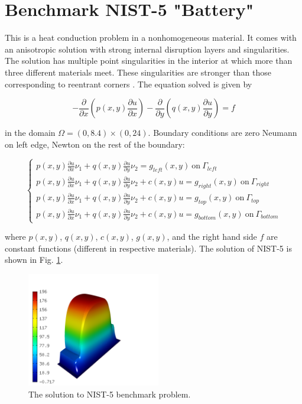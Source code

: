 \section{Benchmark NIST-5 "Battery"}
\label{sec:bench-5}

This is a heat conduction problem in a nonhomogeneous material.
It comes with an anisotropic solution with strong internal disruption
layers and singularities.
The solution has multiple point singularities in the interior at which
more than three different materials meet. These singularities are stronger than those
corresponding to reentrant corners \cite{demkowicz-1}.
The equation solved is given by

\begin{equation} \label{heat-conduction}
-\frac{\partial }{\partial x}\left(p(x, y)\frac{\partial u}{\partial x}\right)
-\frac{\partial }{\partial y}\left(q(x, y)\frac{\partial u}{\partial y}\right) = f 
\end{equation}

in the domain $\Omega = (0, 8.4) \times (0, 24)$. Boundary conditions are zero Neumann on left edge, Newton on the rest of the boundary:

\begin{equation}
\left\{
\begin{array}{l}
\displaystyle p(x, y)\frac{\partial u}{\partial x}\nu_1 + q(x, y)\frac{\partial u}{\partial y}\nu_2 = g_{left}(x, y) \ \mbox{on} \  \Gamma_{left} \\
\displaystyle p(x, y)\frac{\partial u}{\partial x}\nu_1 + q(x, y)\frac{\partial u}{\partial y}\nu_2 + c(x, y)u = g_{right}(x, y) \ \mbox{on} \ \Gamma_{right} \\
\displaystyle p(x, y)\frac{\partial u}{\partial x}\nu_1 + q(x, y)\frac{\partial u}{\partial y}\nu_2 + c(x, y)u = g_{top}(x, y) \ \mbox{on} \ \Gamma_{top} \\
\displaystyle p(x, y)\frac{\partial u}{\partial x}\nu_1 + q(x, y)\frac{\partial u}{\partial y}\nu_2 + c(x, y)u = g_{bottom}(x, y) \ \mbox{on} \ \Gamma_{bottom} 
\end{array}
\right.
\end{equation}

where $p(x, y)$, $q(x, y)$, $c(x, y)$, $g(x, y)$, and the right hand
side $f$ are constant functions (different in respective materials).
The solution of NIST-5 is shown in Fig. \ref{fig:sln-nist05}.

\begin{figure}[!ht]
\centering
\includegraphics[height=5cm]{nist/nist-5/solution.png}
\caption{The solution to NIST-5 benchmark problem.}
\label{fig:sln-nist05}
\end{figure}

